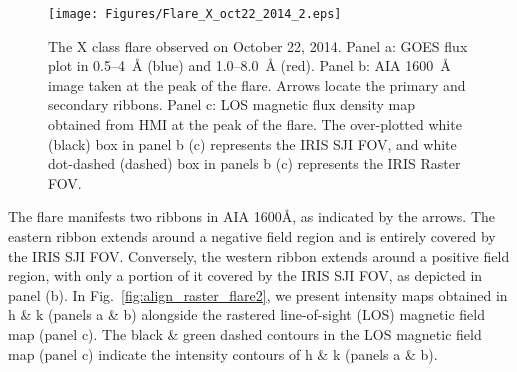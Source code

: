 \begin{figure}[ht!]
    \centering
\hspace*{-.5in}
\texttt{[image: Figures/Flare\_X\_oct22\_2014\_2.eps]}
\caption{The X class flare observed on October 22, 2014. Panel a: GOES flux plot in 0.5{--}4~{\AA} (blue) and 1.0{--}8.0~{\AA} (red). Panel b: AIA 1600~{\AA} image taken at the peak of the flare. Arrows locate the primary and secondary ribbons. Panel c: LOS magnetic flux density map obtained from HMI at the peak of the flare. The over-plotted white (black) box in panel b (c) represents the IRIS SJI FOV, and white dot-dashed (dashed) box in panels b (c) represents the IRIS Raster FOV.}\label{flare2}
\end{figure}

The flare manifests two ribbons in AIA 1600{\AA}, as indicated by the arrows. The eastern ribbon extends around a negative field region and is entirely covered by the IRIS SJI FOV. Conversely, the western ribbon extends around a positive field region, with only a portion of it covered by the IRIS SJI FOV, as depicted in panel (b). In Fig.~\ref{fig:align_raster_flare2}, we present intensity maps obtained in   h \& k (panels a \& b) alongside the rastered line-of-sight (LOS) magnetic field map (panel c). The black \& green dashed contours in the LOS magnetic field map (panel c) indicate the intensity contours of   h \& k (panels a \& b).

